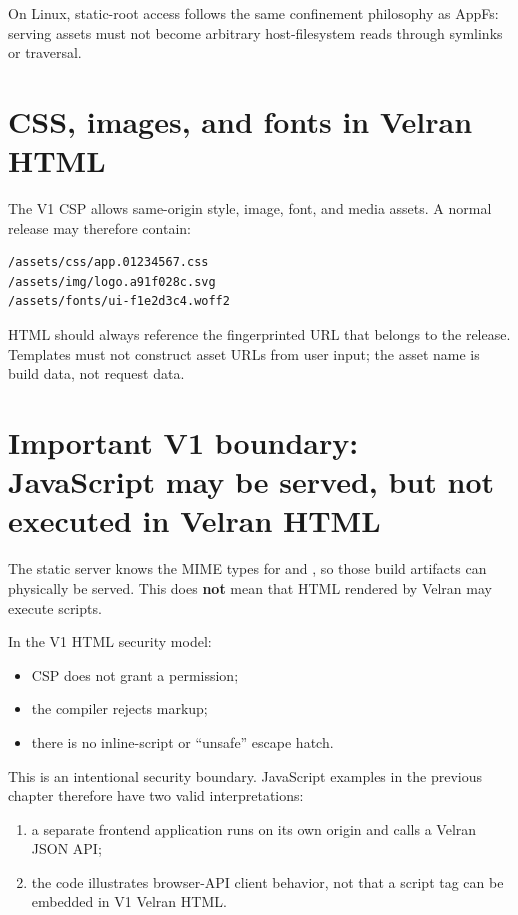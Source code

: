 On Linux, static-root access follows the same confinement philosophy as AppFs: serving assets must not become arbitrary host-filesystem reads through symlinks or traversal.

\section{CSS, images, and fonts in Velran HTML}

The V1 CSP allows same-origin style, image, font, and media assets. A normal release may therefore contain:

\begin{lstlisting}
/assets/css/app.01234567.css
/assets/img/logo.a91f028c.svg
/assets/fonts/ui-f1e2d3c4.woff2
\end{lstlisting}

HTML should always reference the fingerprinted URL that belongs to the release. Templates must not construct asset URLs from user input; the asset name is build data, not request data.

\section{Important V1 boundary: JavaScript may be served, but not executed in Velran HTML}

The static server knows the MIME types for  and , so those build artifacts can physically be served. This does \textbf{not} mean that HTML rendered by Velran may execute scripts.

In the V1 HTML security model:

\begin{itemize}
  \item CSP does not grant a  permission;
  \item the compiler rejects  markup;
  \item there is no inline-script or ``unsafe'' escape hatch.
\end{itemize}

This is an intentional security boundary. JavaScript  examples in the previous chapter therefore have two valid interpretations:

\begin{enumerate}
  \item a separate frontend application runs on its own origin and calls a Velran JSON API;
  \item the code illustrates browser-API client behavior, not that a script tag can be embedded in V1 Velran HTML.
\end{enumerate}

